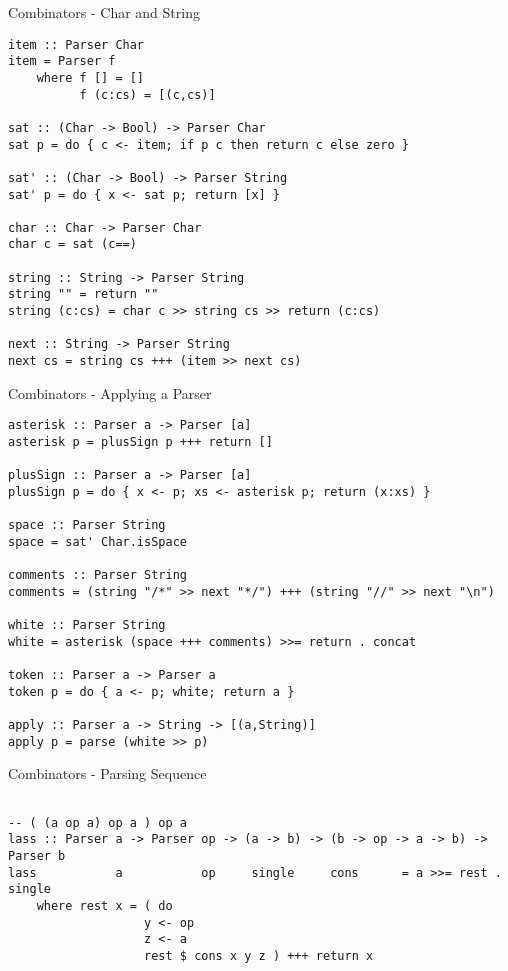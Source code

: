 \documentclass[12pt]{beamer}
\newcommand{\codesize}{\fontsize{7.7}{7.7}}
\begin{document}
\begin{spacing}{1.3}
\begin{frame}[fragile=singleslide]{Combinators - Char and String}

\begin{verbatim}
item :: Parser Char
item = Parser f
    where f [] = []
          f (c:cs) = [(c,cs)]

sat :: (Char -> Bool) -> Parser Char
sat p = do { c <- item; if p c then return c else zero }

sat' :: (Char -> Bool) -> Parser String
sat' p = do { x <- sat p; return [x] }

char :: Char -> Parser Char
char c = sat (c==)

string :: String -> Parser String
string "" = return ""
string (c:cs) = char c >> string cs >> return (c:cs)

next :: String -> Parser String
next cs = string cs +++ (item >> next cs)
\end{verbatim}
\end{frame}

\begin{frame}[fragile=singleslide]{Combinators - Applying a Parser}

\begin{verbatim}
asterisk :: Parser a -> Parser [a]
asterisk p = plusSign p +++ return []

plusSign :: Parser a -> Parser [a]
plusSign p = do { x <- p; xs <- asterisk p; return (x:xs) }

space :: Parser String
space = sat' Char.isSpace

comments :: Parser String
comments = (string "/*" >> next "*/") +++ (string "//" >> next "\n")

white :: Parser String
white = asterisk (space +++ comments) >>= return . concat

token :: Parser a -> Parser a
token p = do { a <- p; white; return a }

apply :: Parser a -> String -> [(a,String)]
apply p = parse (white >> p)
\end{verbatim}
\end{frame}

\begin{frame}[fragile=singleslide]{Combinators - Parsing Sequence}
\begin{verbatim}

-- ( (a op a) op a ) op a
lass :: Parser a -> Parser op -> (a -> b) -> (b -> op -> a -> b) -> Parser b
lass           a           op     single     cons      = a >>= rest . single
    where rest x = ( do
                   y <- op
                   z <- a
                   rest $ cons x y z ) +++ return x


\end{verbatim}
\end{frame}
\end{spacing}
\end{document}
